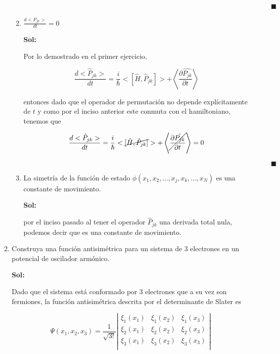 \documentclass[12pt,a4paper]{article}
\begin{document}
\begin{enumerate}
\begin{enumerate}
    $\hspace{15cm} \blacksquare$
    
    \item $\frac{d <\hat{P}_{jk}>}{dt} = 0$
    
    \textbf{Sol:}
    
    Por lo demostrado en el primer ejercicio,
    
    \begin{equation*}
        \frac{d <\hat{P}_{jk}>}{dt} = \frac{i}{ \hbar} <[\hat{H}, \hat{P}_{jk}]> + \left<\frac{\partial \hat{P_{jk}}}{\partial t} \right>
    \end{equation*}
    
    entonces dado que el operador de permutación no depende explícitamente de $t$ y como por el inciso anterior este conmuta con el hamiltoniano, tenemos que
    
    \begin{equation*}
        \frac{d <\hat{P}_{jk}>}{dt} = \frac{i}{ \hbar} <\cancel{[\hat{H}, \hat{P}_{jk}]}> + \left <\cancel{  \frac{\partial \hat{P_{jk}}}{\partial t}  }\right> = 0
    \end{equation*}
    
    $\hspace{15cm} \blacksquare$
    
    
    
    \item La simetría de la función de estado $\phi(x_1,x_2,...,x_j,x_k,...,x_N)$ es una constante de movimiento. 
    
    \textbf{Sol:}
    
    por el inciso pasado al tener el operador $\hat{P}_{jk}$ una derivada total nula, podemos decir que es una constante de movimiento.
    
\end{enumerate}






\item Construya una función antisimétrica para un sistema de 3 electrones en un potencial de oscilador armónico.

\textbf{Sol:}

Dado que el sistema está conformado por 3 electrones que a su vez son fermiones, la función antisimétrica descrita por el determinante de Slater es 

\begin{equation*}
    \Psi(x_1,x_2,x_3) =\frac{1}{\sqrt{3!}} \left|\begin{matrix}
    \xi_1 (x_1) & \xi_1 (x_2) & \xi_1 (x_3) \\
    \xi_2 (x_1) & \xi_2 (x_2) & \xi_2 (x_3) \\
    \xi_{3} (x_1) & \xi_{3} (x_2) & \xi_{3} (x_3) \\
    \end{matrix}\right|
\end{equation*}


\end{enumerate}
\end{document}
